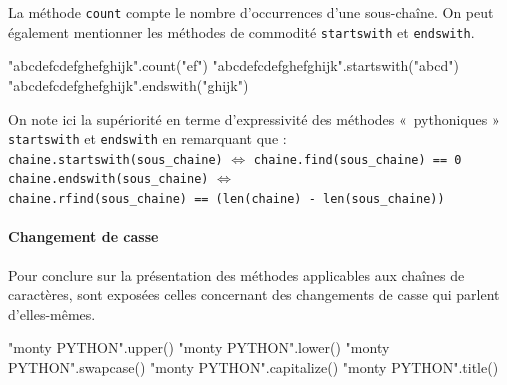La méthode \texttt{count} compte le nombre d'occurrences d'une sous-chaîne. On peut également mentionner les méthodes de commodité \texttt{startswith} et \texttt{endswith}.

\begin{idleconsole}
	\begin{pyconsole}
		"abcdefcdefghefghijk".count("ef")
		"abcdefcdefghefghijk".startswith("abcd")
		"abcdefcdefghefghijk".endswith("ghijk")
\end{pyconsole}
\end{idleconsole}

On note ici la supériorité en terme d'expressivité des méthodes «~pythoniques » \texttt{startswith} et \texttt{endswith} en remarquant que :\\[4pt]
\texttt{chaine.startswith(sous\_chaine)} $\Leftrightarrow$ \texttt{chaine.find(sous\_chaine) == 0}\\[4pt]
\texttt{chaine.endswith(sous\_chaine)} $\Leftrightarrow$\\ \texttt{chaine.rfind(sous\_chaine) == (len(chaine) - len(sous\_chaine))}

\vspace{-1pt}%

\paragraph{Changement de casse}
Pour conclure sur la présentation des méthodes applicables aux chaînes de caractères, sont exposées celles concernant des changements de casse qui parlent d'elles-mêmes.

\begin{idleconsole}
	\begin{pyconsole}
		"monty PYTHON".upper()
		"monty PYTHON".lower()
		"monty PYTHON".swapcase()
		"monty PYTHON".capitalize()
		"monty PYTHON".title()
\end{pyconsole}
\end{idleconsole}

\vspace{1pt}

